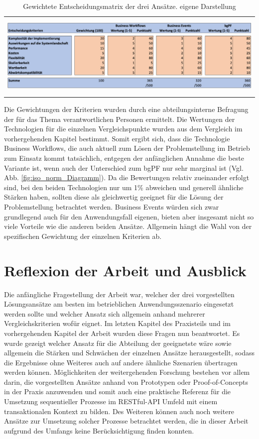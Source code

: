 \begin{table}[h]
    \centering
    \begin{tabular}{c}
        \includegraphics[height=4cm]{Bilder/Handlungsempfehlung_Entscheidungsmatrix.png}
    \end{tabular}
    \caption[Gewichtete Entscheidungsmatrix der drei Ansätze]{Gewichtete Entscheidungsmatrix der drei Ansätze. eigene Darstellung}
    \label{tab:iso_norm_Entscheidungsmatrix}
\end{table}


Die Gewichtungen der Kriterien wurden durch eine abteilungsinterne Befragung der für das Thema verantwortlichen Personen ermittelt. Die Wertungen der Technologien für die einzelnen Vergleichspunkte wurden aus dem Vergleich im vorhergehenden Kapitel bestimmt. Somit ergibt sich, dass die Technologie Business Workflows, die auch aktuell zum Lösen der Problemstellung im Betrieb zum Einsatz kommt tatsächlich, entgegen der anfänglichen Annahme die beste Variante ist, wenn auch der Unterschied zum bgPF nur sehr marginal ist (Vgl. Abb. \ref{fig:iso_norm_Diagramm}). Da die Bewertungen relativ zueinander erfolgt sind, bei den beiden Technologien nur um 1\% abweichen und generell ähnliche Stärken haben, sollten diese als gleichwertig geeignet für die Lösung der Problemstellung betrachtet werden. Business Events würden sich zwar grundlegend auch für den Anwendungsfall eigenen, bieten aber insgesamt nicht so viele Vorteile wie die anderen beiden Ansätze. Allgemein hängt die Wahl von der spezifischen Gewichtung der einzelnen Kriterien ab. 

\section{Reflexion der Arbeit und Ausblick}

Die anfängliche Fragestellung der Arbeit war, welcher der drei vorgestellten Lösungsansätze am besten im betrieblichen Anwendungsszenario eingesetzt werden sollte und welcher Ansatz sich allgemein anhand mehrerer Vergleichskriterien wofür eignet. Im letzten Kapitel des Praxisteils und im vorhergehenden Kapitel der Arbeit wurden diese Fragen nun beantwortet. Es wurde gezeigt welcher Ansatz für die Abteilung der geeignetste wäre sowie allgemein die Stärken und Schwächen der einzelnen Ansätze herausgestellt, sodass die Ergebnisse ohne Weiteres auch auf andere ähnliche Szenarien übertragen werden können. Möglichkeiten der weitergehenden Forschung bestehen vor allem darin, die vorgestellten Ansätze anhand von Prototypen oder Proof-of-Concepts in der Praxis anzuwenden und somit auch eine praktische Referenz für die Umsetzung sequentieller Prozesse im RESTful-API Umfeld mit einem transaktionalen Kontext zu bilden. Des Weiteren können auch noch weitere Ansätze zur Umsetzung solcher Prozesse betrachtet werden, die in dieser Arbeit aufgrund des Umfangs keine Berücksichtigung finden konnten.